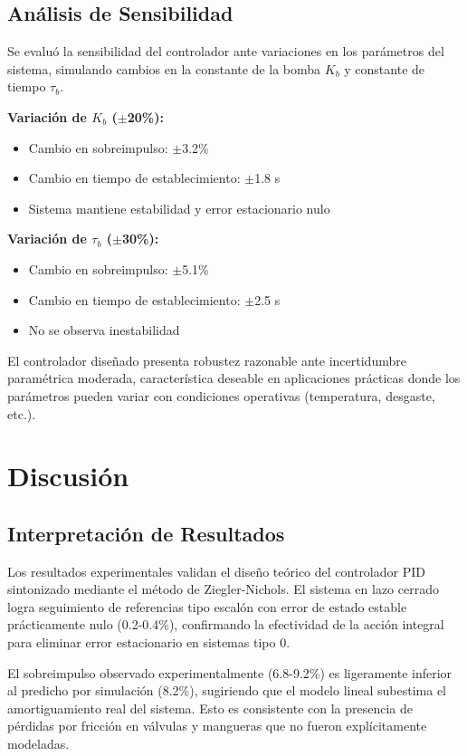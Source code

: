 \documentclass[conference]{IEEEtran}
\begin{document}
\subsection{Análisis de Sensibilidad}

Se evaluó la sensibilidad del controlador ante variaciones en los parámetros del sistema, simulando cambios en la constante de la bomba $K_b$ y constante de tiempo $\tau_b$.

\textbf{Variación de $K_b$ ($\pm$20\%):}
\begin{itemize}
\item Cambio en sobreimpulso: $\pm$3.2\%
\item Cambio en tiempo de establecimiento: $\pm$1.8 s
\item Sistema mantiene estabilidad y error estacionario nulo
\end{itemize}

\textbf{Variación de $\tau_b$ ($\pm$30\%):}
\begin{itemize}
\item Cambio en sobreimpulso: $\pm$5.1\%
\item Cambio en tiempo de establecimiento: $\pm$2.5 s
\item No se observa inestabilidad
\end{itemize}

El controlador diseñado presenta robustez razonable ante incertidumbre paramétrica moderada, característica deseable en aplicaciones prácticas donde los parámetros pueden variar con condiciones operativas (temperatura, desgaste, etc.).

\section{Discusión}

\subsection{Interpretación de Resultados}

Los resultados experimentales validan el diseño teórico del controlador PID sintonizado mediante el método de Ziegler-Nichols. El sistema en lazo cerrado logra seguimiento de referencias tipo escalón con error de estado estable prácticamente nulo (0.2-0.4\%), confirmando la efectividad de la acción integral para eliminar error estacionario en sistemas tipo 0.

El sobreimpulso observado experimentalmente (6.8-9.2\%) es ligeramente inferior al predicho por simulación (8.2\%), sugiriendo que el modelo lineal subestima el amortiguamiento real del sistema. Esto es consistente con la presencia de pérdidas por fricción en válvulas y mangueras que no fueron explícitamente modeladas.
\end{document}
